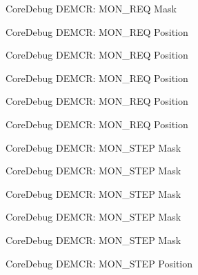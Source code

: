 \begin{DoxyRefList}
\label{deprecated__deprecated000499}%
%
Core\+Debug D\+E\+M\+CR\+: M\+O\+N\+\_\+\+R\+EQ Mask  
\item[Member \mbox{\hyperlink{group__CMSIS__CoreDebug_ga341020a3b7450416d72544eaf8e57a64}{Core\+Debug\+\_\+\+D\+E\+M\+C\+R\+\_\+\+M\+O\+N\+\_\+\+R\+E\+Q\+\_\+\+Pos}} ]\label{deprecated__deprecated000047}%
%
Core\+Debug D\+E\+M\+CR\+: M\+O\+N\+\_\+\+R\+EQ Position 

\label{deprecated__deprecated000191}%
%
Core\+Debug D\+E\+M\+CR\+: M\+O\+N\+\_\+\+R\+EQ Position 

\label{deprecated__deprecated000333}%
%
Core\+Debug D\+E\+M\+CR\+: M\+O\+N\+\_\+\+R\+EQ Position 

\label{deprecated__deprecated000409}%
%
Core\+Debug D\+E\+M\+CR\+: M\+O\+N\+\_\+\+R\+EQ Position 

\label{deprecated__deprecated000498}%
%
Core\+Debug D\+E\+M\+CR\+: M\+O\+N\+\_\+\+R\+EQ Position  
\item[Member \mbox{\hyperlink{group__CMSIS__CoreDebug_ga2ded814556de96fc369de7ae9a7ceb98}{Core\+Debug\+\_\+\+D\+E\+M\+C\+R\+\_\+\+M\+O\+N\+\_\+\+S\+T\+E\+P\+\_\+\+Msk}} ]\label{deprecated__deprecated000050}%
%
Core\+Debug D\+E\+M\+CR\+: M\+O\+N\+\_\+\+S\+T\+EP Mask 

\label{deprecated__deprecated000194}%
%
Core\+Debug D\+E\+M\+CR\+: M\+O\+N\+\_\+\+S\+T\+EP Mask 

\label{deprecated__deprecated000336}%
%
Core\+Debug D\+E\+M\+CR\+: M\+O\+N\+\_\+\+S\+T\+EP Mask 

\label{deprecated__deprecated000412}%
%
Core\+Debug D\+E\+M\+CR\+: M\+O\+N\+\_\+\+S\+T\+EP Mask 

\label{deprecated__deprecated000501}%
%
Core\+Debug D\+E\+M\+CR\+: M\+O\+N\+\_\+\+S\+T\+EP Mask  
\item[Member \mbox{\hyperlink{group__CMSIS__CoreDebug_ga9ae10710684e14a1a534e785ef390e1b}{Core\+Debug\+\_\+\+D\+E\+M\+C\+R\+\_\+\+M\+O\+N\+\_\+\+S\+T\+E\+P\+\_\+\+Pos}} ]\label{deprecated__deprecated000049}%
%
Core\+Debug D\+E\+M\+CR\+: M\+O\+N\+\_\+\+S\+T\+EP Position 


\end{DoxyRefList}
